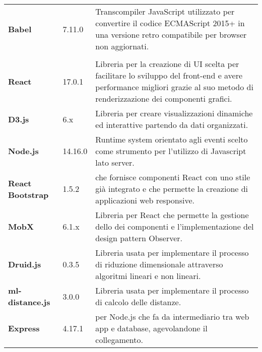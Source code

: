 {\begin{longtable}{C{3cm} | C{2cm} | C{10cm}}
	\textbf{Babel} & 
	7.11.0 &
	Transcompiler JavaScript utilizzato per convertire il codice ECMAScript 2015+ in una versione retro compatibile per browser non aggiornati. \\
  
\\
 
	\textbf{React} & 
	17.0.1 &
	Libreria per la creazione di UI scelta per facilitare lo sviluppo del front-end e avere performance migliori grazie al suo metodo di renderizzazione dei componenti grafici.\\ 
 
 	\textbf{D3.js} & 
	6.x &
	Libreria per creare visualizzazioni dinamiche ed interattive partendo da dati organizzati.
\\

	\textbf{Node.js} & 
	14.16.0 &
	Runtime system orientato agli eventi scelto come strumento per l'utilizzo di Javascript lato server.\\
 
	\textbf{React Bootstrap} & 
	1.5.2 &
	 che fornisce componenti React con uno stile già integrato e che permette la creazione di applicazioni web responsive.\\
		
	\textbf{MobX} & 
	6.1.x &
	Libreria per React che permette la gestione dello  dei componenti  e l'implementazione del design pattern Observer.\\
	
	\textbf{Druid.js} & 
	0.3.5 &
	Libreria usata per implementare il processo di riduzione dimensionale attraverso algoritmi lineari e non lineari.\\
	
	\textbf{ml-distance.js} & 
	3.0.0 &
	Libreria usata per implementare il processo di calcolo delle distanze.\\

	\textbf{Express} & 
	4.17.1 &
	 per Node.js che fa da intermediario tra web app e database, agevolandone il collegamento.\\

%
\end{longtable}	
}



